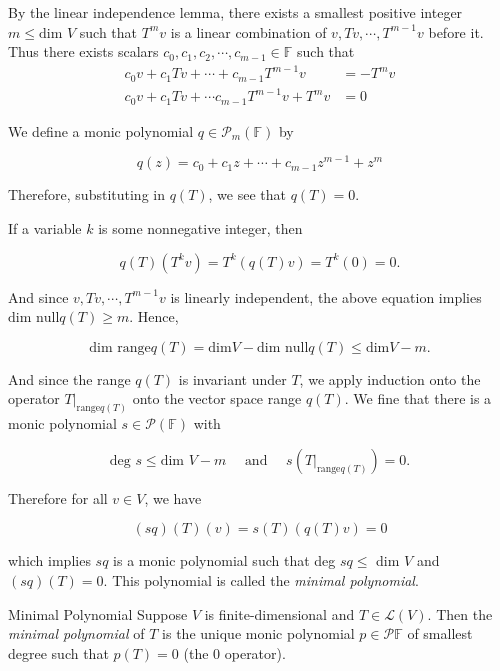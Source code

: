 \documentclass[svgnames]{article}     %
\begin{document}
By the linear independence lemma, there exists a smallest positive integer $m
\leq \text{dim } V$ such that $T^m v$ is a linear combination of $v, Tv,
\cdots, T^{m-1} v$ before it. Thus there exists scalars $c_0, c_1, c_2, \cdots
, c_{m-1} \in \mathbb{F}$ such that 
\begin{align*}
  c_0v + c_1 Tv + \cdots + c_{m-1}T^{m-1}v &= - T^m v\\
  c_0v + c_1 Tv + \cdots c_{m-1} T^{m-1} v + T^m v &= 0
\end{align*}

We define a monic polynomial $q \in \mathcal{P}_m(\mathbb{F})$ by 

\[
  q(z) = c_0 + c_1z + \cdots + c_{m-1} z^{m-1} + z^m
\] \vspace{3px}

Therefore, substituting in $q(T)$, we see that $q(T) = 0$. 

If a variable  $k$ is some nonnegative integer, then 

\[
q(T) (T^k v) = T^k (q(T) v) = T^k (0) = 0. 
\] \vspace{3px}

And since $v, Tv, \cdots, T^{m-1} v$ is linearly independent, the above
equation implies $\text{dim null} q(T) \geq m$. Hence, 

\[
\text{dim range} q(T) = \text{dim} V - \text{dim null}q(T) \leq \text{dim}
V - m. 
\] \vspace{3px}

And since the range $q(T)$ is invariant under $T$, we apply induction onto the
operator $T\big|_{\text{range} q(T) } $ onto the vector space range $q(T)$. We
fine that there is a monic polynomial $s \in \mathcal{P}(\mathbb{F})$ with 

\[
\text{deg }  s\leq \text{dim } V - m \quad \text{ and } \quad
s(T\big|_{\text{range} q(T)} ) = 0. 
\] \vspace{3px}


Therefore for all $v \in V$, we have 

\[
  (sq)(T)(v) = s(T)(q(T)v) = 0
\] \vspace{3px}

which implies $sq$ is a monic polynomial such that deg $sq \leq$ dim $V$ and
$(sq)(T) = 0$. This polynomial is called the \textit{minimal polynomial}. 

\begin{mainbox}{Minimal Polynomial}
  Suppose  $V$ is finite-dimensional and $T \in \mathcal{L}(V)$. Then the
  \textit{minimal polynomial} of $T$ is the unique monic polynomial $p \in
  \mathcal{P}{\mathbb{F}}$ of smallest degree such that $p(T) = 0$ (the
  0 operator). 
\end{mainbox}
\end{document}
